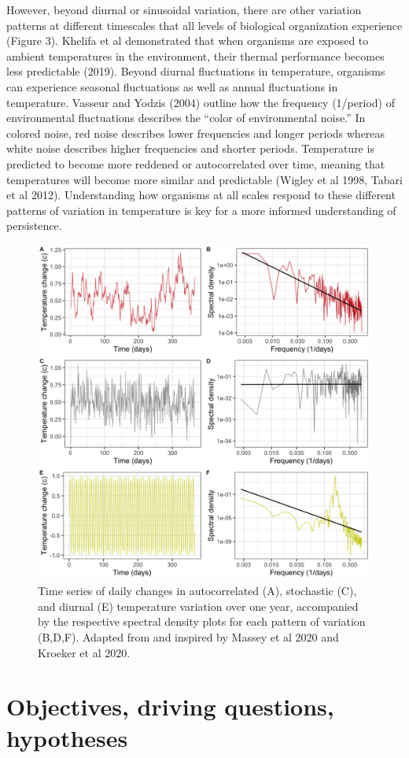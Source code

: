 \documentclass[12pt,twoside]{reedthesis}
\begin{document}
However, beyond diurnal or sinusoidal variation, there are other variation patterns at different timescales that all levels of biological organization experience (Figure 3). Khelifa et al demonstrated that when organisms are exposed to ambient temperatures in the environment, their thermal performance becomes less predictable (2019). Beyond diurnal fluctuations in temperature, organisms can experience seasonal fluctuations as well as annual fluctuations in temperature. Vasseur and Yodzis (2004) outline how the frequency (1/period) of environmental fluctuations describes the ``color of environmental noise.'' In colored noise, red noise describes lower frequencies and longer periods whereas white noise describes higher frequencies and shorter periods. Temperature is predicted to become more reddened or autocorrelated over time, meaning that temperatures will become more similar and predictable (Wigley et al 1998, Tabari et al 2012). Understanding how organisms at all scales respond to these different patterns of variation in temperature is key for a more informed understanding of persistence.
\begin{figure}
\includegraphics[width=0.9\linewidth]{figures/figure4} \caption{Time series of daily changes in autocorrelated (A), stochastic (C), and diurnal (E) temperature variation over one year, accompanied by the respective spectral density plots for each pattern of variation (B,D,F). Adapted from and inspired by Massey et al 2020 and Kroeker et al 2020.}\label{fig:unnamed-chunk-5}
\end{figure}
\hypertarget{objectives-driving-questions-hypotheses}{%
\section{Objectives, driving questions, hypotheses}\label{objectives-driving-questions-hypotheses}}
\end{document}
